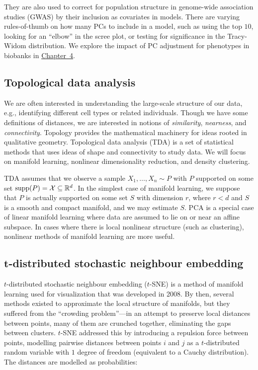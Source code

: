 They are also used to correct for population structure in genome-wide association studies (GWAS) by their inclusion as covariates in models\cite{price_principal_2006}. There are varying rules-of-thumb on how many PCs to include in a model, such as using the top $10$, looking for an ``elbow'' in the scree plot, or testing for significance in the Tracy-Widom distribution. We explore the impact of PC adjustment for phenotypes in biobanks in \hyperref[chap:chapter4]{Chapter~4}. 

\subsection{Topological data analysis}

We are often interested in understanding the large-scale structure of our data, e.g., identifying different cell types or related individuals. Though we have some definitions of distances, we are interested in notions of \textit{similarity}, \textit{nearness}, and \textit{connectivity}. Topology provides the mathematical machinery for ideas rooted in qualitative geometry\citep{carlsson_topology_2009}. Topological data analysis (TDA) is a set of statistical methods that uses ideas of shape and connectivity to study data\citep{wasserman_topological_2018}. We will focus on manifold learning, nonlinear dimensionality reduction, and density clustering.

TDA assumes that we observe a sample $X_1, \dots, X_n \sim P$ with $P$ supported on some set $\operatorname{supp}(P) = \mathcal{X} \subseteq \mathbb{R}^d$. 
In the simplest case of manifold learning, we suppose that $P$ is actually supported on some set $S$ with dimension $r$, where $r < d$ and $S$ is a smooth and compact manifold, and we may estimate $S$. PCA is a special case of linear manifold learning where data are assumed to lie on or near an affine subspace\citep{wasserman_topological_2018}. In cases where there is local nonlinear structure (such as clustering), nonlinear methods of manifold learning are more useful\cite{izenman_introduction_2012}.

\subsection{\texorpdfstring{$\mathbf{t}$}{f}-distributed stochastic neighbour embedding}

$t$-distributed stochastic neighbour embedding ($t$-SNE) is a method of manifold learning used for visualization that was developed in 2008\citep{maaten_visualizing_2008}. By then, several methods existed to approximate the local structure of manifolds, but they suffered from the ``crowding problem''---in an attempt to preserve local distances between points, many of them are crunched together, eliminating the gaps between clusters. $t$-SNE addressed this by introducing a repulsion force between points, modelling pairwise distances between points $i$ and $j$ as a $t$-distributed random variable with $1$ degree of freedom (equivalent to a Cauchy distribution). The distances are modelled as probabilities:

